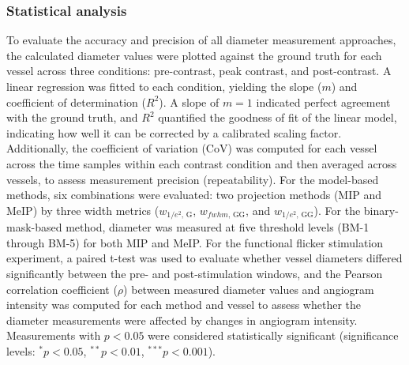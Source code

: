 \subsubsection{Statistical analysis}
\label{subsubsec:stats}
To evaluate the accuracy and precision of all diameter measurement approaches, the calculated diameter values were plotted against the ground truth for each vessel across three conditions: pre-contrast, peak contrast, and post-contrast. A linear regression was fitted to each condition, yielding the slope ($m$) and coefficient of determination ($R^2$). A slope of $m = 1$ indicated perfect agreement with the ground truth, and $R^2$ quantified the goodness of fit of the linear model, indicating how well it can be corrected by a calibrated scaling factor. Additionally, the coefficient of variation (CoV) was computed for each vessel across the time samples within each contrast condition and then averaged across vessels, to assess measurement precision (repeatability). For the model-based methods, six combinations were evaluated: two projection methods (MIP and MeIP) by three width metrics ($w_{1/e^2,\,\mathrm{G}}$, $w_{fwhm,\,\mathrm{GG}}$, and $w_{1/e^2,\,\mathrm{GG}}$). For the binary-mask-based method, diameter was measured at five threshold levels (BM-1 through BM-5) for both MIP and MeIP. For the functional flicker stimulation experiment, a paired t-test was used to evaluate whether vessel diameters differed significantly between the pre- and post-stimulation windows, and the Pearson correlation coefficient ($\rho$) between measured diameter values and angiogram intensity was computed for each method and vessel to assess whether the diameter measurements were affected by changes in angiogram intensity. Measurements with $p < 0.05$ were considered statistically significant (significance levels: $^{*}p < 0.05$, $^{**}p < 0.01$, $^{***}p < 0.001$). 
